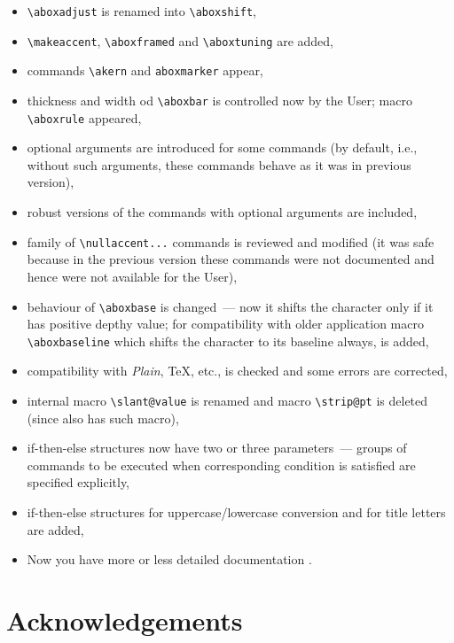 \begin{itemize}
\item \verb?\aboxadjust? is renamed into \verb?\aboxshift?,
\item \verb?\makeaccent?, \verb?\aboxframed? and \verb?\aboxtuning?
      are added,
\item commands \verb?\akern? and \verb?aboxmarker? appear,
\item thickness and width od \verb?\aboxbar? is controlled now
      by the User; macro \verb?\aboxrule? appeared,
\item optional arguments are introduced for some commands
      (by default, i.e., without such arguments, these commands
      behave as it was in previous version),
\item robust versions of the commands with optional arguments are included,
\item family of \verb?\nullaccent...? commands is reviewed and
      modified (it was safe because in the previous version
      these commands were not documented and hence were not available
      for the User),
\item behaviour of \verb?\aboxbase? is changed~--- now it shifts
      the character only if it has positive depthy value; for compatibility
      with older application macro \verb?\aboxbaseline? which shifts
      the character to its baseline always, is added,
\item compatibility with {\sl Plain}, \AmS\TeX, etc., is checked
      and some errors are corrected,
\item internal macro \verb?\slant@value? is renamed and macro
      \verb?\strip@pt? is deleted (since \LaTeXe{} also has such macro),
\item \textsf{if-then-else} structures now have two or three
      parameters~--- groups of commands to be executed when
      corresponding condition is satisfied are specified explicitly,
\item \textsf{if-then-else} structures for uppercase/lowercase
      conversion and for title letters are added,
\item Now you have more or less detailed documentation \hackersmile.
\end{itemize}

\section*{Acknowledgements}


